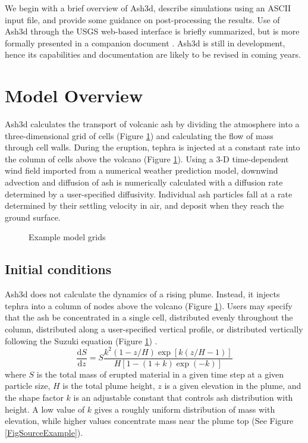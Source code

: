 We begin with a brief overview of Ash3d, describe simulations using an ASCII input
file, and provide some guidance on post-processing the results. Use of Ash3d through
the USGS web-based interface is briefly summarized, but is more formally presented
in a companion document \cite{Mastin13a}. Ash3d is still in development, hence its
capabilities and documentation are likely to be revised in coming years.

\section{Model Overview}\label{ChapIntroSecModelOverview}
Ash3d calculates the transport of volcanic ash by dividing the atmosphere into a
three-dimensional grid of cells (Figure \ref{FigAsh3dGrid}) and calculating the
flow of mass through cell walls. During the eruption, tephra is injected at a constant
rate into the column of cells above the volcano (Figure \ref{FigAsh3dGrid}).
Using a 3-D time-dependent wind field imported from a numerical weather
prediction model, downwind advection and diffusion of ash is numerically calculated with a
diffusion rate determined by a user-specified diffusivity. Individual ash
particles fall at a rate determined by their settling velocity in air, and
deposit when they reach the ground surface.
\begin{figure}[htbp]
\parbox{15cm}{\caption{\label{FigAsh3dGrid}
Example model grids}}
\end{figure}

\subsection{Initial conditions}\label{ChapIntroSecInitCond}
Ash3d does not calculate the dynamics of a rising plume. Instead, it injects
tephra into a column of nodes above the volcano (Figure \ref{FigAsh3dGrid}).
Users may specify
that the ash be concentrated in a single cell, distributed evenly throughout
the column, distributed along a user-specified vertical profile, or distributed
vertically following the Suzuki equation
(Figure \ref{FigAsh3dGrid}) \cite{Carey96,Suzuki83}.
\begin{equation}
 \frac{\mathrm{d}S}{\mathrm{d}z} = S\frac{k^2\left( 1-z/H \right)\exp\left[k\left(z/H-1 \right) \right]}
 {H \left[1-\left(1+k \right)\exp \left( -k\right) \right]} \label{EqSuz}
\end{equation}
where $S$ is the total mass of erupted material in a given time step at a
given particle size, $H$ is the total plume height, $z$ is a given elevation
in the plume, and the shape factor $k$ is an adjustable constant that controls
ash distribution with height. A low value of $k$ gives a roughly uniform
distribution of mass with elevation, while higher values concentrate mass
near the plume top (See Figure \ref{FigSourceExample}).

